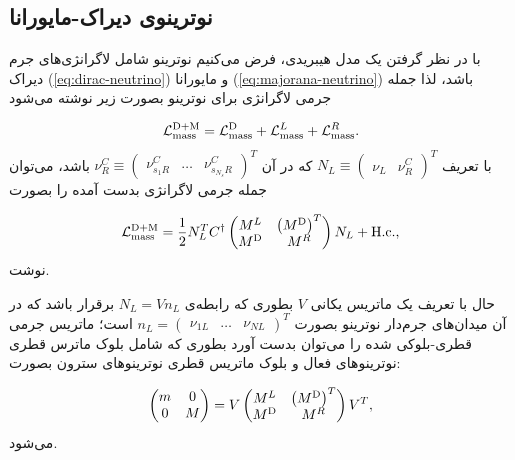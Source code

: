\documentclass[a4paper]{book}
\begin{document}
\subsection{نوترینوی دیراک-مایورانا}
با در نظر گرفتن یک مدل هیبریدی، فرض می‌کنیم نوترینو شامل لاگرانژی‌های جرم دیراک (\ref{eq:dirac-neutrino}) و مایورانا (\ref{eq:majorana-neutrino}) باشد، لذا جمله جرمی لاگرانژی برای نوترینو بصورت زیر نوشته می‌شود
\par
\vspace{-0.5cm}
{\footnotesize\begin{align}
	\mathcal{L}^{\rm D+M}_{\rm mass}=\mathcal{L}^{\rm D}_{\rm mass}+\mathcal{L}^{L}_{\rm mass}+\mathcal{L}^{R}_{\rm mass}.
\end{align}}
با تعریف {\footnotesize$N_L\equiv\begin{pmatrix}\nu_L&\nu_R^C\end{pmatrix}^T$} که در آن {\footnotesize$\nu_R^C \equiv \begin{pmatrix}\nu_{s_1 R}^C & \dots & \nu_{s_{{N_s}}R}^C\end{pmatrix}^T$} باشد، می‌توان جمله جرمی لاگرانژی بدست آمده را بصورت
\par
\vspace{-0.5cm}
{\footnotesize\begin{align}
	\mathcal{L}^{\rm D+M}_{\rm mass}=\frac{1}{2} N_L^T C^{\dagger}
	\begin{pmatrix}
		M^L&\left(M^{\rm D}\right)^T\\
		M^{\rm D}&M^R
	\end{pmatrix}
	N_L+{\rm H.c.},
	\label{eq:hybrid-mass-term}
\end{align}}
نوشت. 
				
حال با تعریف یک ماتریس یکانی {\footnotesize$V$} بطوری که رابطه‌ی {\footnotesize$N_L=V n_L$} برقرار باشد که در آن میدان‌های جرم‌دار نوترینو بصورت {\footnotesize$n_L=\begin{pmatrix}\nu_{1L}& \dots & \nu_{NL}\end{pmatrix}^T$} است؛ ماتریس جرمی قطری-بلوکی شده را می‌توان بدست آورد بطوری که شامل بلوک ماترس قطری نوترینوهای فعال و بلوک ماتریس قطری نوترینوهای سترون بصورت:
\par
\vspace{-0.5cm}
{\footnotesize\begin{align}
	\begin{pmatrix}
		m&0\\
		0&M
	\end{pmatrix}=V
	\begin{pmatrix}
		M^L&\left(M^{\rm D}\right)^T\\
		M^{\rm D}&M^R
	\end{pmatrix}
	V^T,
\end{align}}
می‌شود.
\end{document}
